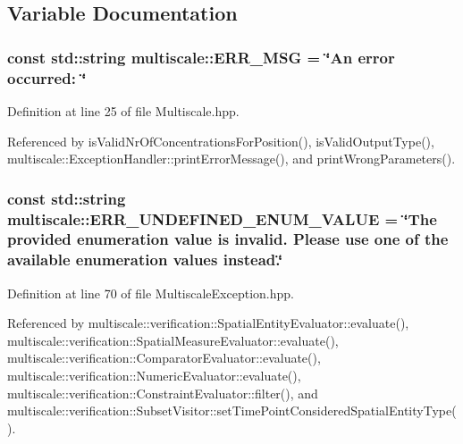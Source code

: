 \subsection{Variable Documentation}
\hypertarget{namespacemultiscale_a06490e4e11ef359aa0260f96579ce584}{
\subsubsection[{E\-R\-R\-\_\-\-M\-S\-G}]{\setlength{\rightskip}{0pt plus 5cm}const std\-::string multiscale\-::\-E\-R\-R\-\_\-\-M\-S\-G = \char`\"{}An error occurred\-: \char`\"{}}}\label{namespacemultiscale_a06490e4e11ef359aa0260f96579ce584}


Definition at line 25 of file Multiscale.\-hpp.



Referenced by is\-Valid\-Nr\-Of\-Concentrations\-For\-Position(), is\-Valid\-Output\-Type(), multiscale\-::\-Exception\-Handler\-::print\-Error\-Message(), and print\-Wrong\-Parameters().

\hypertarget{namespacemultiscale_a870e6a43e813a5df46b265f4986a0510}{
\subsubsection[{E\-R\-R\-\_\-\-U\-N\-D\-E\-F\-I\-N\-E\-D\-\_\-\-E\-N\-U\-M\-\_\-\-V\-A\-L\-U\-E}]{\setlength{\rightskip}{0pt plus 5cm}const std\-::string multiscale\-::\-E\-R\-R\-\_\-\-U\-N\-D\-E\-F\-I\-N\-E\-D\-\_\-\-E\-N\-U\-M\-\_\-\-V\-A\-L\-U\-E = \char`\"{}The provided enumeration value is invalid. Please use one of the available enumeration values instead.\char`\"{}}}\label{namespacemultiscale_a870e6a43e813a5df46b265f4986a0510}


Definition at line 70 of file Multiscale\-Exception.\-hpp.



Referenced by multiscale\-::verification\-::\-Spatial\-Entity\-Evaluator\-::evaluate(), multiscale\-::verification\-::\-Spatial\-Measure\-Evaluator\-::evaluate(), multiscale\-::verification\-::\-Comparator\-Evaluator\-::evaluate(), multiscale\-::verification\-::\-Numeric\-Evaluator\-::evaluate(), multiscale\-::verification\-::\-Constraint\-Evaluator\-::filter(), and multiscale\-::verification\-::\-Subset\-Visitor\-::set\-Time\-Point\-Considered\-Spatial\-Entity\-Type().

